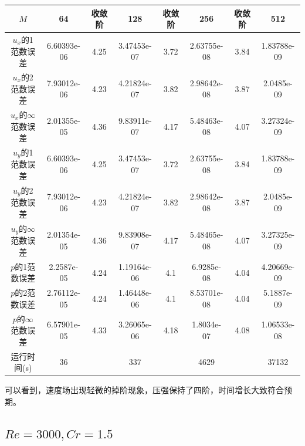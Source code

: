 \documentclass[lang=cn,10pt,bibend=bibtex]{elegantbook}
\begin{document}
\begin{table}[H]
  \centering
  \small
  \begin{tabular}{c|ccccccc}
  \textbf{$M$}              & 64          & 收敛阶 & 128         & 收敛阶 & 256         & 收敛阶 & 512   \\ \hline
  $u_x$的1范数误差 & 6.60393e-06 & 4.25 & 3.47453e-07 & 3.72 & 2.63755e-08 & 3.84 & 1.83788e-09\\
  $u_x$的2范数误差 & 7.93012e-06 & 4.23 & 4.21824e-07 & 3.82 & 2.98642e-08 & 3.87 & 2.0485e-09\\
  $u_x$的$\infty$范数误差 & 2.01355e-05 & 4.36 & 9.83911e-07 & 4.17 & 5.48463e-08 & 4.07 & 3.27324e-09\\
  $u_y$的1范数误差 & 6.60393e-06 & 4.25 & 3.47453e-07 & 3.72 & 2.63755e-08 & 3.84 & 1.83788e-09\\
  $u_y$的2范数误差 & 7.93012e-06 & 4.23 & 4.21824e-07 & 3.82 & 2.98642e-08 & 3.87 & 2.0485e-09\\
  $u_y$的$\infty$范数误差 & 2.01354e-05 & 4.36 & 9.83908e-07 & 4.17 & 5.48465e-08 & 4.07 & 3.27325e-09\\
  $p$的1范数误差 & 2.2587e-05 & 4.24 & 1.19164e-06 & 4.1 & 6.9285e-08 & 4.04 & 4.20669e-09\\
  $p$的2范数误差 & 2.76112e-05 & 4.24 & 1.46448e-06 & 4.1 & 8.53701e-08 & 4.04 & 5.1887e-09\\  
  $p$的$\infty$范数误差 & 6.57901e-05 & 4.33 & 3.26065e-06 & 4.18 & 1.8034e-07 & 4.08 & 1.06533e-08\\
  运行时间(s)                &      36      &       &      337     &       &     4629     &       &   37132
  \end{tabular}
\end{table}

可以看到，速度场出现轻微的掉阶现象，压强保持了四阶，时间增长大致符合预期。

\subsection{$Re=3000,Cr=1.5$}
\end{document}
